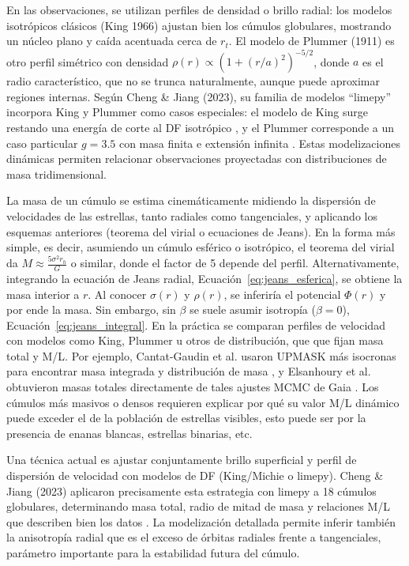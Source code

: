     En las observaciones, se utilizan perfiles de densidad o brillo radial: los 
    modelos isotrópicos clásicos (King 1966) ajustan bien los cúmulos 
    globulares, mostrando un núcleo plano y caída acentuada cerca de $r_t$. 
    El modelo de Plummer (1911) es otro perfil simétrico con densidad $\rho(r) 
    \varpropto \left(1 + (r/a)^2\right)^{-5/2}$, donde $a$ es el radio 
    característico, que no se trunca naturalmente, aunque puede aproximar 
    regiones internas. Según Cheng \& Jiang (2023), su familia de modelos 
    ``limepy'' incorpora King y Plummer como casos especiales: el modelo de 
    King surge restando una energía de corte al DF isotrópico \cite{Cheng2023}, 
    y el Plummer corresponde a un caso particular $g=3.5$ con masa finita e 
    extensión infinita \cite{Cheng2023}. Estas modelizaciones dinámicas permiten 
    relacionar observaciones proyectadas con distribuciones de masa 
    tridimensional.

    La masa de un cúmulo se estima cinemáticamente midiendo la dispersión de 
    velocidades de las estrellas, tanto radiales como tangenciales, y aplicando 
    los esquemas anteriores (teorema del virial o ecuaciones de Jeans). En la 
    forma más simple, es decir, asumiendo un cúmulo esférico o isotrópico, el 
    teorema del virial da $M \approx \frac{5\sigma^2 r_h}{G}$ o similar, donde 
    el factor de 5 depende del perfil. Alternativamente, integrando la ecuación 
    de Jeans radial, Ecuación~\eqref{eq:jeans_esferica}, se obtiene la masa 
    interior a $r$. Al conocer $\sigma(r)$ y $\rho(r)$, se inferiría el 
    potencial $\Phi(r)$ y por ende la masa. Sin embargo, sin $\beta$ se suele 
    asumir isotropía ($\beta = 0$), Ecuación~\eqref{eq:jeans_integral}. En la 
    práctica se comparan perfiles de velocidad con modelos como King, Plummer u 
    otros de distribución, que que fijan masa total y M/L. Por ejemplo, 
    Cantat-Gaudin et al. usaron UPMASK más isocronas para encontrar masa 
    integrada y distribución de masa \cite{cantat2018gaia}, y Elsanhoury et al. 
    obtuvieron masas totales directamente de tales ajustes MCMC de Gaia 
    \cite{Elsanhoury2026}. Los cúmulos más masivos o densos requieren explicar 
    por qué su valor M/L dinámico puede exceder el de la población de estrellas 
    visibles, esto puede ser por la presencia de enanas blancas, estrellas 
    binarias, etc.

    Una técnica actual es ajustar conjuntamente brillo superficial y perfil de 
    dispersión de velocidad con modelos de DF (King/Michie o limepy). Cheng \& 
    Jiang (2023) aplicaron precisamente esta estrategia con limepy a 18 cúmulos 
    globulares, determinando masa total, radio de mitad de masa y relaciones M/L 
    que describen bien los datos \cite{Cheng2023}. La modelización detallada 
    permite inferir también la anisotropía radial que es el exceso de órbitas 
    radiales frente a tangenciales, parámetro importante para la estabilidad 
    futura del cúmulo.

